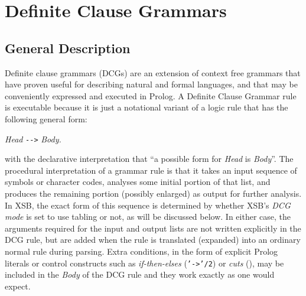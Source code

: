 \chapter{Definite Clause Grammars} \label{DCGs}

\section{General Description}

Definite clause grammars (DCGs) are an extension of context free
grammars that have proven useful for describing natural and formal
languages, and that may be conveniently expressed and executed in
Prolog.  A Definite Clause Grammar rule is executable because it is
just a notational variant of a logic rule that has the following
general form:
\begin{center}
                {\em Head} {\tt \verb|-->|} {\em Body.}
\end{center}
with the declarative interpretation that ``a possible form for {\em
Head} is {\em Body}''. The procedural interpretation of a grammar rule
is that it takes an input sequence of symbols or character codes,
analyses some initial portion of that list, and produces the remaining
portion (possibly enlarged) as output for further analysis.  In XSB,
the exact form of this sequence is determined by whether XSB's {\em
DCG mode} is set to use tabling or not, as will be discussed below.
In either case, the arguments required for the input and output lists
are not written explicitly in the DCG rule, but are added when the
rule is translated (expanded) into an ordinary normal rule during
parsing.  Extra conditions, in the form of explicit Prolog literals or
control constructs such as {\em if-then-elses} ({\tt '->'/2}) or {\em
cuts} (\cut), may be included in the {\em
Body} of the DCG rule and they work exactly as one would expect.

